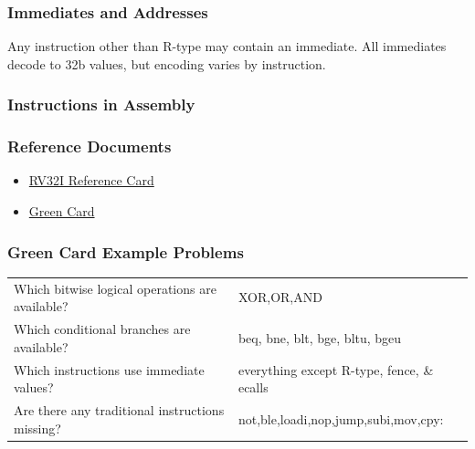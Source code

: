 \documentclass[10pt,a4paper]{article}
\begin{document}
      \subsubsection{Immediates and Addresses}
        Any instruction other than R-type may contain an immediate. All immediates decode to 32b values, but encoding varies by instruction.
      \subsubsection{Instructions in Assembly}
      \subsubsection{Reference Documents}
        \begin{itemize}
          \item \href{https://github.com/jameslzhu/riscv-card/releases/download/latest/riscv-card.pdf}{RV32I Reference Card}
          \item \href{http://riscvbook.com/greencard-20181213.pdf}{Green Card}
        \end{itemize}
      \subsubsection{Green Card Example Problems}
        \begin{table}[ht]
          \begin{tabular}{ll}
            Which bitwise logical operations are available? & XOR,OR,AND                                 \\
            Which conditional branches are available?       & beq, bne, blt, bge, bltu, bgeu             \\
            Which instructions use immediate values?        & everything except R-type, fence, \& ecalls \\
            Are there any traditional instructions missing? & not,ble,loadi,nop,jump,subi,mov,cpy:
          \end{tabular}
        \end{table}
\end{document}
